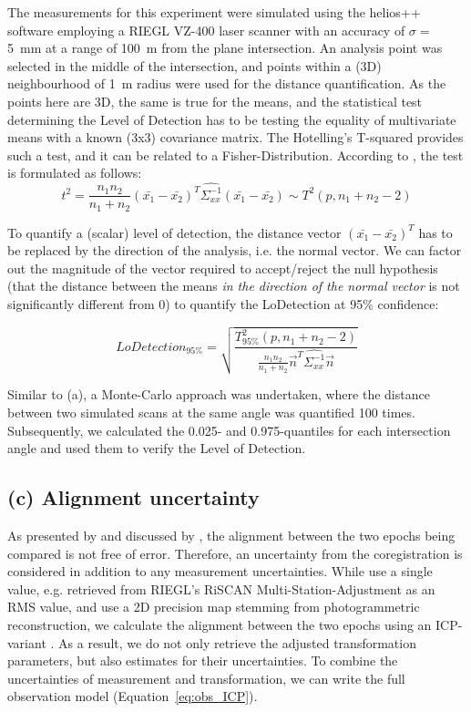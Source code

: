 \documentclass[preprint,12pt,3p]{elsarticle}
\begin{document}
The measurements for this experiment were simulated using the helios++ software employing a RIEGL VZ-400 laser scanner with an accuracy of $\sigma=$\SI{5}{mm} at a range of \SI{100}{m} from the plane intersection. An analysis point was selected in the middle of the intersection, and points within a (3D) neighbourhood of \SI{1}{m} radius were used for the distance quantification.
As the points here are 3D, the same is true for the means, and the statistical test determining the Level of Detection has to be testing the equality of multivariate means with a known (3x3) covariance matrix. The Hotelling’s T-squared provides such a test, and it can be related to a Fisher-Distribution. According to \citet{Hotelling_1992}, the test is formulated as follows:
\begin{equation}
    t^2 = \frac{n_1 n_2}{n_1 + n_2} \left(\bar{x_1} - \bar{x_2}\right)^T \hat{\Sigma_{xx}^{-1}} \left(\bar{x_1} - \bar{x_2}\right) \sim T^2(p, n_1+n_2-2)
\end{equation}

To quantify a (scalar) level of detection, the distance vector $\left(\bar{x_1} - \bar{x_2}\right)^T$ has to be replaced by the direction of the analysis, i.e. the normal vector. We can factor out the magnitude of the vector required to accept/reject the null hypothesis (that the distance between the means \emph{in the direction of the normal vector} is not significantly different from 0) to quantify the LoDetection at 95\% confidence:

\begin{equation}
    LoDetection_{95\%} = \sqrt{\frac{T^2_{95\%}(p, n_1+n_2-2)}{\frac{n_1 n_2}{n_1 + n_2} \vec{n}^T \hat{\Sigma_{xx}^{-1}} \vec{n}}}
\end{equation}

Similar to (a), a Monte-Carlo approach was undertaken, where the distance between two simulated scans at the same angle was quantified 100 times. Subsequently, we calculated the 0.025- and 0.975-quantiles for each intersection angle and used them to verify the Level of Detection.


\subsection{(c) Alignment uncertainty}
\label{sec:methods-c}
As presented by \citet{Lague_2013} and discussed by \citet{James_Robson_Smith_2017}, the alignment between the two epochs being compared is not free of error. Therefore, an uncertainty from the coregistration is considered in addition to any measurement uncertainties. While \citet{Lague_2013} use a single value, e.g. retrieved from RIEGL’s RiSCAN Multi-Station-Adjustment as an RMS value, and \citet{James_Robson_Smith_2017} use a 2D precision map stemming from photogrammetric reconstruction, we calculate the alignment between the two epochs using an ICP-variant \citep{besl1992method, glira2015correspondence}. As a result, we do not only retrieve the adjusted transformation parameters, but also estimates for their uncertainties. 
To combine the uncertainties of measurement and transformation, we can write the full observation model (Equation~\ref{eq:obs_ICP}).
\end{document}
